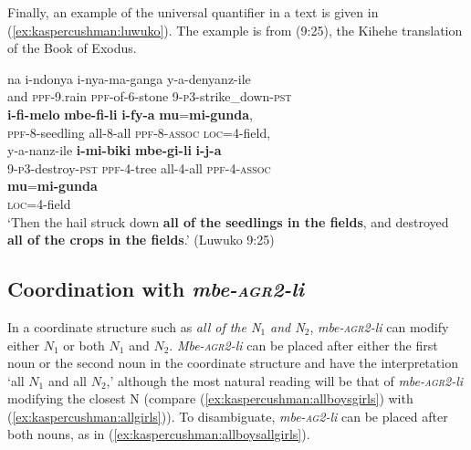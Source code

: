 \documentclass[output=paper,modfonts,nonflat]{langsci/langscibook}
\begin{document}
Finally, an example of the universal quantifier in a text is given in (\ref{ex:kaspercushman:luwuko}). The example is from \citet{ex:kaspercushman:luwuko} (9:25), the Kihehe translation of the Book of Exodus.

\begin{exe} 
\ex\label{ex:kaspercushman:luwuko}
\gll na i-ndonya i-nya-ma-ganga y-a-denyanz-ile \\ 
and \textsc{ppf}-9.rain \textsc{ppf}-of-6-stone 9-\textsc{p3}-strike\_down-\textsc{pst}\\


\gll \textbf{i-fi-melo} \textbf{mbe-fi-li} \textbf{i-fy-a} \textbf{mu}=\textbf{mi-gunda}, \\
\textsc{ppf}-8-seedling all-8-all \textsc{ppf}-8-\textsc{assoc} \textsc{loc}=4-field,\\


\gll y-a-nanz-ile \textbf{i-mi-biki} \textbf{mbe-gi-li} \textbf{i-j-a}  \\
9-\textsc{p3}-destroy-\textsc{pst} \textsc{ppf}-4-tree all-4-all \textsc{ppf}-4-\textsc{assoc}  \\


\gll \textbf{mu}=\textbf{mi-gunda} \\ 
\textsc{loc}=4-field \\

\glt `Then the hail struck down \textbf{all of the seedlings in the fields}, and destroyed \textbf{all of the crops in the fields}.' \hfill{(Luwuko 9:25)} \\
\end{exe}

\subsection{Coordination with \emph{mbe-\textsc{agr2}-li}}

In a coordinate structure such as \textit{all of the N$_{1}$ and N$_{2}$}, \emph{mbe-\textsc{agr2}-li}  can modify either $N_{1}$ or both $N_{1}$ and $N_{2}$.  \emph{Mbe-\textsc{agr2}-li} can be placed after either the first noun or the second noun in the coordinate structure and have the interpretation `all $N_{1}$ and all $N_{2}$,' although the most natural reading will be that of \emph{mbe-\textsc{agr2}-li} modifying the closest N (compare (\ref{ex:kaspercushman:allboysgirls}) with (\ref{ex:kaspercushman:allgirls})). To disambiguate, \emph{mbe-\textsc{ag2}-li} can be placed after both nouns, as in (\ref{ex:kaspercushman:allboysallgirls}).
\end{document}
